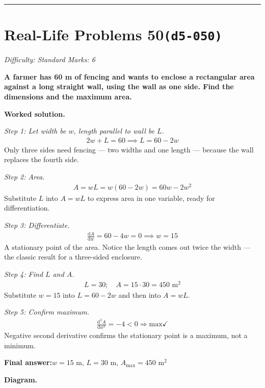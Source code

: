 \documentclass[11pt]{article}
\newcommand{\question}[1]{\par\medskip\noindent\textbf{#1}\par}
\begin{document}
\medskip\hrule

\section*{Real-Life Problems 50\quad\small\texttt{(d5-050)}}
\textit{Difficulty: Standard \quad\textbar\quad Marks: 6}

\question{A farmer has 60 m of fencing and wants to enclose a rectangular area against a long straight wall, using the wall as one side. Find the dimensions and the maximum area.}

\textbf{Worked solution.}

\textit{Step 1: Let width be \( w \), length parallel to wall be \( L \).}
\[\begin{gathered}
2w + L = 60 \implies L = 60 - 2w
\end{gathered}\]
Only three sides need fencing --- two widths and one length --- because the wall replaces the fourth side.

\textit{Step 2: Area.}
\[\begin{gathered}
A = wL = w(60 - 2w) = 60w - 2w^2
\end{gathered}\]
Substitute \( L \) into \( A = wL \) to express area in one variable, ready for differentiation.

\textit{Step 3: Differentiate.}
\[\begin{gathered}
\frac{\mathrm{d}A}{\mathrm{d}w} = 60 - 4w = 0 \implies w = 15
\end{gathered}\]
A stationary point of the area. Notice the length comes out twice the width --- the classic result for a three-sided enclosure.

\textit{Step 4: Find \( L \) and \( A \).}
\[\begin{gathered}
L = 30; \quad A = 15 \cdot 30 = 450 \text{ m}^2
\end{gathered}\]
Substitute \( w = 15 \) into \( L = 60 - 2w \) and then into \( A = wL \).

\textit{Step 5: Confirm maximum.}
\[\begin{gathered}
\frac{\mathrm{d}^2A}{\mathrm{d}w^2} = -4 < 0 \Rightarrow \text{max} \checkmark
\end{gathered}\]
Negative second derivative confirms the stationary point is a maximum, not a minimum.

\begin{answerbox}
\textbf{Final answer:}\quad \(\displaystyle  w = 15 \) m, \(\displaystyle  L = 30 \) m, \(\displaystyle  A_{\max} = 450 \text{ m}^2 \)
\end{answerbox}
\textbf{Diagram.}
\end{document}

